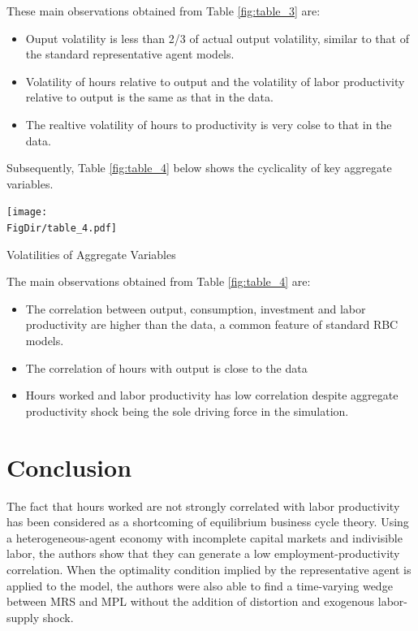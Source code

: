 \documentclass[titlepage,letterpaper]{\econtex}
\begin{document}
These main observations obtained from Table \ref{fig:table_3} are:
\begin{itemize}
\item Ouput volatility is less than 2/3 of actual output volatility, similar to that of the standard representative agent models.
\item Volatility of hours relative to output and the volatility of labor productivity relative to output is the same as that in the data.
\item The realtive volatility of hours to productivity is very colse to that in the data.
\end{itemize}

Subsequently, Table \ref{fig:table_4}  below shows the cyclicality of key aggregate variables.

       \begin{table}[ht]
         \centering
         \texttt{[image: \\FigDir/table\_4.pdf]}
         \caption{Volatilities of Aggregate Variables}
    \label{fig:table_4}
  \end{table}
  
The main observations obtained from Table \ref{fig:table_4}  are:
\begin{itemize}
\item The correlation between output, consumption, investment and labor productivity are higher than the data, a common feature of standard RBC models.
\item The correlation of hours with output is close to the data
\item Hours worked and labor productivity has low correlation despite aggregate productivity shock being the sole driving force in the simulation.
  \end{itemize} 

\hypertarget{LCandCCIntro}{}

\section{Conclusion}

The fact that hours worked are not strongly correlated with labor productivity has been considered as a shortcoming of equilibrium business cycle theory. Using a heterogeneous-agent economy with incomplete capital markets and indivisible labor, the authors show that they can generate a low employment-productivity correlation. When the optimality condition implied by the representative agent is applied to the model, the authors were also able to find a time-varying wedge between MRS and MPL without the addition of distortion and exogenous labor-supply shock.
\end{document}
